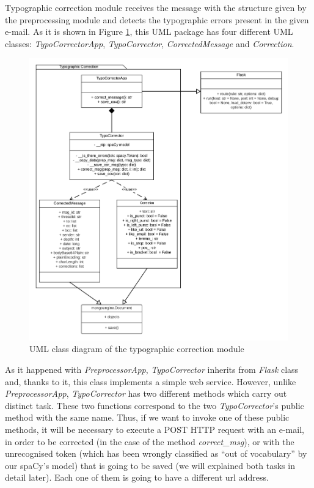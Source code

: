 Typographic correction module receives the message with the structure given by the preprocessing module and detects the typographic errors present in the given e-mail. As it is shown in Figure \ref{fig:umltypo}, this UML package has four different UML classes: \textit{TypoCorrectorApp}, \textit{TypoCorrector}, \textit{CorrectedMessage} and \textit{Correction}.

\begin{figure}[p]
	\centering%
	\centerline{\includegraphics[width=0.9\paperwidth]{Imagenes/Bitmap/Analyser/typoUML.png}}%
	\caption{UML class diagram of the typographic correction module}%
	\label{fig:umltypo}
\end{figure}

As it happened with \textit{PreprocessorApp}, \textit{TypoCorrector} inherits from \textit{Flask} class and, thanks to it, this class implements a simple web service. However, unlike \textit{PreprocessorApp}, \textit{TypoCorrector} has two different methods which carry out distinct task. These two functions correspond to the two \textit{TypoCorrector}'s public method with the same name. Thus, if we want to invoke one of these public methods, it will be necessary to execute a POST HTTP request with an e-mail, in order to be corrected (in the case of the method \textit{correct\_msg}), or with the unrecognised token (which has been wrongly classified as ``out of vocabulary'' by our spaCy's model) that is going to be saved (we will explained both tasks in detail later). Each one of them is going to have a different url address.

